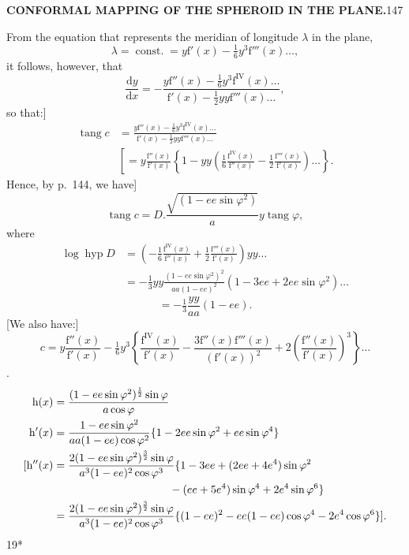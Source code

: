 \par\clearpage
\noindent\null\hfill{\small\textbf{CONFORMAL MAPPING OF THE SPHEROID IN THE PLANE.}}\hfill147\par\medskip
From the equation that represents the meridian of longitude \(\lambda\) in the plane,
\[\lambda=\operatorname{const.}=y\mathrm f'(x)-\tfrac16y^3\mathrm f'''(x)\ldots,\]
\noindent it follows, however, that
\[\frac{\mathrm dy}{\mathrm dx}=-\frac{y\mathrm f''(x)-\tfrac16y^3\mathrm f^{\mathrm{IV}}(x)\ldots}{\mathrm f'(x)-\tfrac12yy\mathrm f'''(x)\ldots},\]
\noindent so that:]
\[
\begin{aligned}
\operatorname{tang}c&=\frac{y\mathrm f''(x)-\tfrac16y^3\mathrm f^{\mathrm{IV}}(x)\ldots}{\mathrm f'(x)-\tfrac12yy\mathrm f'''(x)\ldots}\\
&\left[=y\frac{\mathrm f''(x)}{\mathrm f'(x)}\left\{1-yy\left(\tfrac16\frac{\mathrm f^{\mathrm{IV}}(x)}{\mathrm f''(x)}-\tfrac12\frac{\mathrm f'''(x)}{\mathrm f'(x)}\right)\ldots\right\}. \right.
\end{aligned}
\]
Hence, by p.~144, we have]
\[\operatorname{tang}c=D.\frac{\sqrt{(1-ee\sin\varphi^2)}}a y\operatorname{tang}\varphi,\]
\noindent where
\[
\begin{aligned}
\log\operatorname{hyp}D&=\left(-\tfrac16\frac{\mathrm f^{\mathrm{IV}}(x)}{\mathrm f''(x)}+\tfrac12\frac{\mathrm f'''(x)}{\mathrm f'(x)}\right)yy\ldots\\
&=-\tfrac13yy\frac{(1-ee\sin\varphi^2)^2}{aa(1-ee)^2}(1-3ee+2ee\sin\varphi^2)\ldots
\end{aligned}
\]
\noindent[or approximately]
\[=-\tfrac13\frac{yy}{aa}(1-ee).\]
[We also have:]
\[c=y\frac{\mathrm f''(x)}{\mathrm f'(x)}-\tfrac16y^3\left\{\frac{\mathrm f^{\mathrm{IV}}(x)}{\mathrm f'(x)}-\frac{3\mathrm f''(x)\mathrm f'''(x)}{(\mathrm f'(x))^2}+2\left(\frac{\mathrm f''(x)}{\mathrm f'(x)}\right)^3\right\}\ldots\]
.\]
\[
\begin{aligned}
\mathrm h(x)&=\frac{(1-ee\sin\varphi^2)^{\frac12}\sin\varphi}{a\cos\varphi}\\
\mathrm h'(x)&=\frac{1-ee\sin\varphi^2}{aa(1-ee)\cos\varphi^2}\{1-2ee\sin\varphi^2+ee\sin\varphi^4\}\\
{[}\mathrm h''(x)&=\frac{2(1-ee\sin\varphi^2)^{\frac32}\sin\varphi}{a^3(1-ee)^2\cos\varphi^3}\{1-3ee+(2ee+4e^4)\sin\varphi^2\\
&\hspace{37mm}-(ee+5e^4)\sin\varphi^4+2e^4\sin\varphi^6\}\\
&=\frac{2(1-ee\sin\varphi^2)^{\frac32}\sin\varphi}{a^3(1-ee)^2\cos\varphi^3}\{(1-ee)^2-ee(1-ee)\cos\varphi^4-2e^4\cos\varphi^6\}].
\end{aligned}
\]
\noindent\hfill{\small19*}\par

